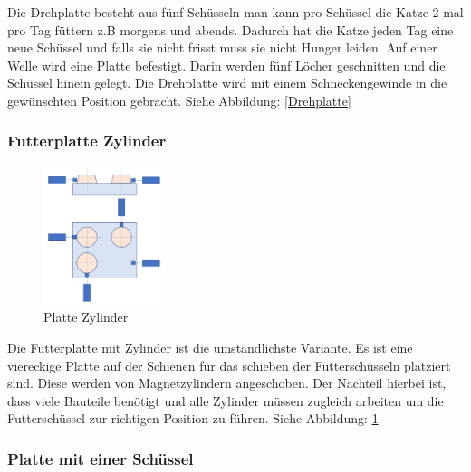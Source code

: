 Die Drehplatte besteht aus fünf Schüsseln man kann pro Schüssel die Katze 2-mal pro Tag füttern z.B morgens und abends. Dadurch hat die Katze jeden Tag eine neue Schüssel und falls sie nicht frisst muss sie nicht Hunger leiden. Auf einer Welle wird eine Platte befestigt. 
Darin werden fünf Löcher geschnitten und die Schüssel hinein gelegt. Die Drehplatte wird mit einem Schneckengewinde in die gewünschten Position gebracht. Siehe Abbildung: \ref{Drehplatte} \vspace{+80pt}
 

\subsubsection{Futterplatte Zylinder}

\begin{figure}
\vspace{-50pt}
  \begin{center}
    \includegraphics[width=0.32\textwidth]{Bilder/Powerpoint/Platte_Zylinder}
  \end{center}
  \caption{Platte Zylinder}
  \label{Platte Zylinder}
  \vspace{-20pt}
\end{figure}

Die Futterplatte mit Zylinder ist die umständlichste Variante. Es ist eine viereckige Platte auf der Schienen für das schieben der Futterschüsseln platziert sind. Diese werden von Magnetzylindern angeschoben. Der Nachteil hierbei ist, dass viele Bauteile benötigt und alle Zylinder müssen zugleich arbeiten um die Futterschüssel zur richtigen Position zu führen. Siehe Abbildung: \ref{Platte Zylinder} 



\subsubsection{Platte mit einer Schüssel}

